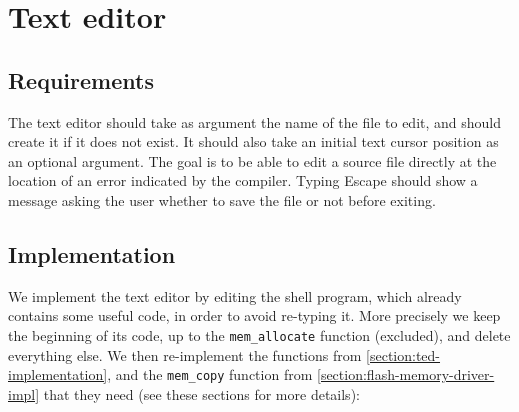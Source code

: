 \section{Text editor}

\subsection{Requirements}

The text editor should take as argument the name of the file to edit, and
should create it if it does not exist. It should also take an initial text
cursor position as an optional argument. The goal is to be able to edit a
source file directly at the location of an error indicated by the compiler.
Typing Escape should show a message asking the user whether to save the file or
not before exiting.

\subsection{Implementation}

We implement the text editor by editing the shell program, which already
contains some useful code, in order to avoid re-typing it. More precisely we
keep the beginning of its code, up to the {\tt mem\_allocate} function
(excluded), and delete everything else. We then re-implement the functions from
\cref{section:ted-implementation}, and the {\tt mem\_copy} function from
\cref{section:flash-memory-driver-impl} that they need (see these sections for
more details):


